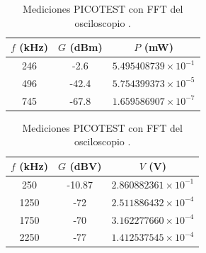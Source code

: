 \begin{table}[h!]
\centering

\begin{minipage}{0.47\textwidth}
\centering
\begin{tabular}{ccc}
\toprule
$f$ (kHz) & $G$ (dBm) & $P$ (mW) \\
\midrule
246 & -2.6  & $5.495408739\times10^{-1}$ \\
496 & -42.4 & $5.754399373\times10^{-5}$ \\
745 & -67.8 & $1.659586907\times10^{-7}$ \\
\bottomrule
\end{tabular}
\caption{Mediciones PICOTEST con analizador de espectros.}
\end{minipage}
\hfill
\begin{minipage}{0.47\textwidth}
\centering
\begin{tabular}{ccc}
\toprule
$f$ (kHz) & $G$ (dBV) & $V$ (V) \\
\midrule
250  & -10.87 & $2.860882361\times10^{-1}$ \\
1250 & -72    & $2.511886432\times10^{-4}$ \\
1750 & -70    & $3.162277660\times10^{-4}$ \\
2250 & -77    & $1.412537545\times10^{-4}$ \\
\bottomrule
\end{tabular}
\caption{Mediciones PICOTEST con FFT del osciloscopio .}
\end{minipage}

\end{table}



